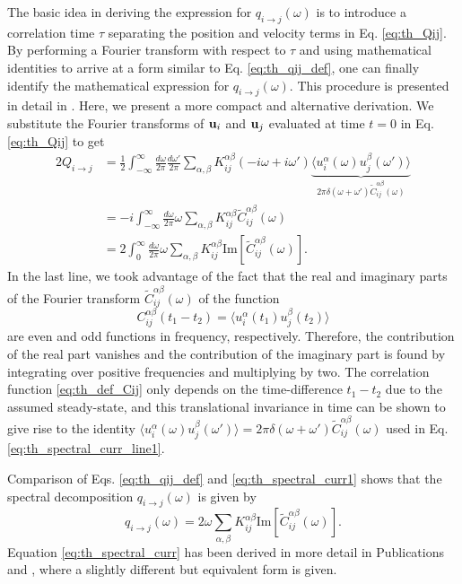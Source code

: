 The basic idea in deriving the expression for $q_{i\to j}(\omega)$ is to introduce a correlation time $\tau$ separating the position and velocity terms in Eq. \eqref{eq:th_Qij}. By performing a Fourier transform with respect to $\tau$ and using mathematical identities to arrive at a form similar to Eq. \eqref{eq:th_qij_def}, one can finally identify the mathematical expression for $q_{i \to j}(\omega)$. This procedure is presented in detail in . Here, we present a more compact and alternative derivation. We substitute the Fourier transforms of $\mathbf{u}_i$ and $\mathbf{u}_j$ evaluated at time $t=0$ in Eq. \eqref{eq:th_Qij} to get
\begin{alignat}{2}
 Q_{i\to j} &= \frac{1}{2} \int_{-\infty}^{\infty} \frac{d\omega}{2\pi} \frac{d\omega'}{2\pi} \sum_{\alpha,\beta} K_{ij}^{\alpha\beta} (-i\omega+i\omega') \underbrace{\langle u_i^{\alpha}(\omega) u_j^{\beta}(\omega') \rangle}_{2\pi \delta(\omega+\omega')\tilde C_{ij}^{\alpha\beta}(\omega)} \label{eq:th_spectral_curr_line1} \\
  &= -i   \int_{-\infty}^{\infty} \frac{d\omega}{2\pi} \omega \sum_{\alpha,\beta} K_{ij}^{\alpha\beta} \tilde C_{ij}^{\alpha\beta}(\omega) \label{eq:th_spectral_curr_line2} \\
  &=  2 \int_{0}^{\infty}\frac{d\omega}{2\pi} \omega \sum_{\alpha,\beta} K_{ij}^{\alpha\beta} \textrm{Im}[\tilde C_{ij}^{\alpha\beta}(\omega)]. \label{eq:th_spectral_curr1}
\end{alignat}
In the last line, we took advantage of the fact that the real and imaginary parts of the Fourier transform $\tilde{C}_{ij}^{\alpha\beta}(\omega)$ of the function
\begin{equation}
 C_{ij}^{\alpha\beta}(t_1-t_2) = \langle u_i^{\alpha}(t_1)u_j^{\beta}(t_2) \rangle \label{eq:th_def_Cij} 
\end{equation}
are even and odd functions in frequency, respectively. Therefore, the contribution of the real part vanishes and the contribution of the imaginary part is found by integrating over positive frequencies and multiplying by two. The correlation function \eqref{eq:th_def_Cij} only depends on the time-difference $t_1-t_2$ due to the assumed steady-state, and this translational invariance in time can be shown to give rise to the identity $\langle u_i^{\alpha}(\omega) u_j^{\beta}(\omega') \rangle = 2\pi \delta(\omega+\omega')\tilde C_{ij}^{\alpha\beta}(\omega)$ used in Eq. \eqref{eq:th_spectral_curr_line1}. 

Comparison of Eqs. \eqref{eq:th_qij_def} and \eqref{eq:th_spectral_curr1} shows that the spectral decomposition $q_{i\to j}(\omega)$ is given by 
\begin{equation}
 q_{i\to j}(\omega) = 2  \omega \sum_{\alpha,\beta} K_{ij}^{\alpha\beta} \textrm{Im}[\tilde C_{ij}^{\alpha\beta}(\omega)]. \label{eq:th_spectral_curr}
\end{equation}
Equation \eqref{eq:th_spectral_curr} has been derived in more detail in Publications  and , where a slightly different but equivalent form is given. 

